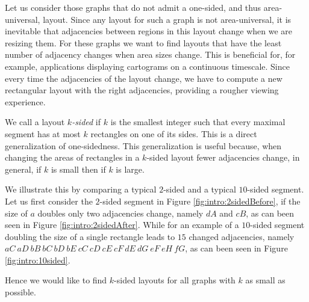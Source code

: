   Let us consider those graphs that do not admit a one-sided, and thus area-universal, layout.
  Since any layout for such a graph is not area-universal, it is inevitable that adjacencies between regions in this layout change when we are resizing them.
  For these graphs we want to find layouts that have the least number of adjacency changes when area sizes change.
  This is beneficial for, for example, applications displaying cartograms on a continuous timescale.
  Since every time the adjacencies of the layout change, we have to compute a new rectangular layout with the right adjacencies, providing a rougher viewing experience.

  We call a layout \emph{$k$-sided} if $k$ is the smallest integer such that every maximal segment has at most $k$ rectangles on one of its sides. This is a direct generalization of one-sidedness.
  This generalization is useful because, when changing the areas of rectangles in a $k$-sided layout fewer adjacencies change, in general, if $k$ is small then if $k$ is large.

  We illustrate this by comparing a typical $2$-sided and a typical $10$-sided segment.
  Let us first consider the $2$-sided segment in Figure \ref{fig:intro:2sidedBefore}, if the size of $a$ doubles only two adjacencies change, namely $dA$ and $cB$, as can been seen in Figure \ref{fig:intro:2sidedAfter}.
  While for an example of a $10$-sided segment doubling the size of a single rectangle leads to $15$ changed adjacencies, namely $aC\ aD\ bB\ bC\ bD\ bE\ cC\ cD\ cE\ cF\ dE\ dG\ eF\ eH\ fG$, as can been seen in Figure \ref{fig:intro:10sided}.

  Hence we would like to find $k$-sided layouts for all graphs with $k$ as small as possible.


